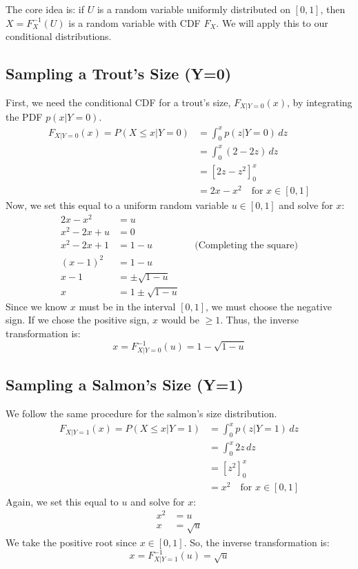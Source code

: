 \documentclass[11pt,a4paper]{article}
\begin{document}
The core idea is: if $U$ is a random variable uniformly distributed on $[0,1]$, then $X = F_X^{-1}(U)$ is a random variable with CDF $F_X$. We will apply this to our conditional distributions.

\subsection{Sampling a Trout's Size (Y=0)}
First, we need the conditional CDF for a trout's size, $F_{X|Y=0}(x)$, by integrating the PDF $p(x|Y=0)$.
\begin{align*}
    F_{X|Y=0}(x) = P(X \le x | Y=0) &= \int_0^x p(z|Y=0) \,dz \\
    &= \int_0^x (2-2z) \,dz \\
    &= \left[ 2z - z^2 \right]_0^x \\
    &= 2x - x^2 \quad \text{for } x \in [0,1]
\end{align*}
Now, we set this equal to a uniform random variable $u \in [0,1]$ and solve for $x$:
\begin{align*}
    2x - x^2 &= u \\
    x^2 - 2x + u &= 0 \\
    x^2 - 2x + 1 &= 1 - u && \text{(Completing the square)} \\
    (x-1)^2 &= 1 - u \\
    x-1 &= \pm\sqrt{1-u} \\
    x &= 1 \pm\sqrt{1-u}
\end{align*}
Since we know $x$ must be in the interval $[0,1]$, we must choose the negative sign. If we chose the positive sign, $x$ would be $\ge 1$. Thus, the inverse transformation is:
\[ x = F_{X|Y=0}^{-1}(u) = 1 - \sqrt{1-u} \]

\subsection{Sampling a Salmon's Size (Y=1)}
We follow the same procedure for the salmon's size distribution.
\begin{align*}
    F_{X|Y=1}(x) = P(X \le x | Y=1) &= \int_0^x p(z|Y=1) \,dz \\
    &= \int_0^x 2z \,dz \\
    &= \left[ z^2 \right]_0^x \\
    &= x^2 \quad \text{for } x \in [0,1]
\end{align*}
Again, we set this equal to $u$ and solve for $x$:
\begin{align*}
    x^2 &= u \\
    x &= \sqrt{u}
\end{align*}
We take the positive root since $x \in [0,1]$. So, the inverse transformation is:
\[ x = F_{X|Y=1}^{-1}(u) = \sqrt{u} \]
\end{document}
